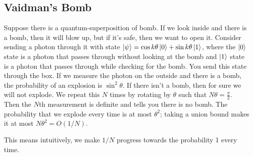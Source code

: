 \subsection{Vaidman's Bomb}
Suppose there is a quantum-superposition of bomb. If we look inside and there is a bomb, then it will blow up,
but if it's safe, then we want to open it. Consider sending a photon through it with state $\ket{\psi} = \cos k\theta \ket{0} + \sin k\theta \ket{1}$,
where the $\ket{0}$ state is a photon that passes through without looking at the bomb and $\ket{1}$ state is a photon that passes through while checking for the bomb.
You send this state through the box. If we measure the photon on the outside and there is a bomb,
the probability of an explosion is $\sin^2 \theta$. If there isn't a bomb, then for sure we will not explode. We repeat this $N$ times by rotating by $\theta$ such that $N \theta = \frac{\pi}{2}$.
Then the $N$th measurement is definite and tells you there is no bomb. The probability that we explode every time is at most $\theta^2$; taking a union
bound makes it at most $N \theta^2 = O(1/N)$.

This means intuitively, we make $1/N$ progress towards the probability 1 every time.